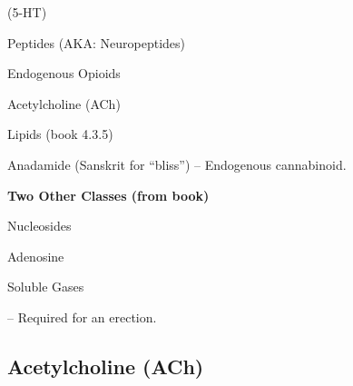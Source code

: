 \begin{coloredlist}
\begin{coloredlist}
        \item {} %
        \begin{coloredlist}
            \item {} (5-HT) %
            \item {} %
        \end{coloredlist}
        \item Peptides (AKA: Neuropeptides)
        \begin{coloredlist}
            \item Endogenous Opioids 
        \end{coloredlist}
        \item Acetylcholine (ACh)
        \item Lipids (book 4.3.5)
        \begin{coloredlist}
            \item Anadamide (Sanskrit for ``bliss'') -- Endogenous cannabinoid.
        \end{coloredlist}
        \item \textbf{Two Other Classes (from book)}
        \begin{coloredlist}
            \item Nucleosides
            \begin{coloredlist}
                \item Adenosine
            \end{coloredlist}
            \item Soluble Gases
            \begin{coloredlist}
                \item {} -- Required for an erection.
            \end{coloredlist}
        \end{coloredlist}
    \end{coloredlist}
\end{coloredlist}

\subsection{Acetylcholine (ACh)}

